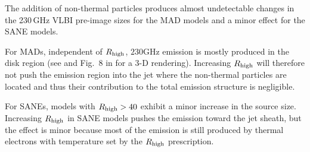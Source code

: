 
The addition of non-thermal particles produces almost undetectable changes in the 230\,GHz VLBI pre-image sizes for the MAD models and a minor effect for the SANE models.

For MADs, independent of $R_\mathrm{high}$, $230$GHz emission is mostly produced in the disk region (see  and Fig.~8 in \citealt{Wong_2022} for a 3-D rendering).  Increasing $R_\mathrm{high}$ will therefore not push the emission region into the jet where the non-thermal particles are located and thus their contribution to the total emission structure is negligible.

For SANEs, models with $R_\mathrm{high}>40$ exhibit a minor increase in the source size.  Increasing $R_\mathrm{high}$ in SANE models pushes the emission toward the jet sheath, but the effect is minor because most of the emission is still produced by thermal electrons with temperature set by the $R_\mathrm{high}$ prescription.






